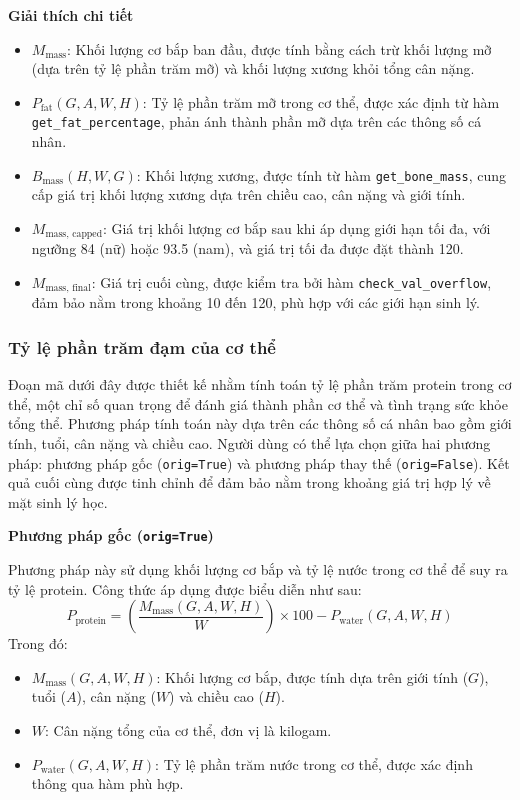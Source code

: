 \textbf{Giải thích chi tiết}
\begin{itemize}
    \item \( M_{\text{mass}} \): Khối lượng cơ bắp ban đầu, được tính bằng cách trừ khối lượng mỡ (dựa trên tỷ lệ phần trăm mỡ) và khối lượng xương khỏi tổng cân nặng.
    \item \( P_{\text{fat}}(G, A, W, H) \): Tỷ lệ phần trăm mỡ trong cơ thể, được xác định từ hàm \texttt{get\_fat\_percentage}, phản ánh thành phần mỡ dựa trên các thông số cá nhân.
    \item \( B_{\text{mass}}(H, W, G) \): Khối lượng xương, được tính từ hàm \texttt{get\_bone\_mass}, cung cấp giá trị khối lượng xương dựa trên chiều cao, cân nặng và giới tính.
    \item \( M_{\text{mass, capped}} \): Giá trị khối lượng cơ bắp sau khi áp dụng giới hạn tối đa, với ngưỡng 84 (nữ) hoặc 93.5 (nam), và giá trị tối đa được đặt thành 120.
    \item \( M_{\text{mass, final}} \): Giá trị cuối cùng, được kiểm tra bởi hàm \texttt{check\_val\_overflow}, đảm bảo nằm trong khoảng 10 đến 120, phù hợp với các giới hạn sinh lý.
\end{itemize}

\subsubsection{Tỷ lệ phần trăm đạm của cơ thể}
Đoạn mã dưới đây được thiết kế nhằm tính toán tỷ lệ phần trăm protein trong cơ thể, một chỉ số quan trọng để đánh giá thành phần cơ thể và tình trạng sức khỏe tổng thể. Phương pháp tính toán này dựa trên các thông số cá nhân bao gồm giới tính, tuổi, cân nặng và chiều cao. Người dùng có thể lựa chọn giữa hai phương pháp: phương pháp gốc (\texttt{orig=True}) và phương pháp thay thế (\texttt{orig=False}). Kết quả cuối cùng được tinh chỉnh để đảm bảo nằm trong khoảng giá trị hợp lý về mặt sinh lý học.

\textbf{Phương pháp gốc (\texttt{orig=True})}

Phương pháp này sử dụng khối lượng cơ bắp và tỷ lệ nước trong cơ thể để suy ra tỷ lệ protein. Công thức áp dụng được biểu diễn như sau:
\[
P_{\text{protein}} = \left( \frac{M_{\text{mass}}(G, A, W, H)}{W} \right) \times 100 - P_{\text{water}}(G, A, W, H)
\]
Trong đó:
\begin{itemize}
    \item \( M_{\text{mass}}(G, A, W, H) \): Khối lượng cơ bắp, được tính dựa trên giới tính (\( G \)), tuổi (\( A \)), cân nặng (\( W \)) và chiều cao (\( H \)).
    \item \( W \): Cân nặng tổng của cơ thể, đơn vị là kilogam.
    \item \( P_{\text{water}}(G, A, W, H) \): Tỷ lệ phần trăm nước trong cơ thể, được xác định thông qua hàm phù hợp.
\end{itemize}

